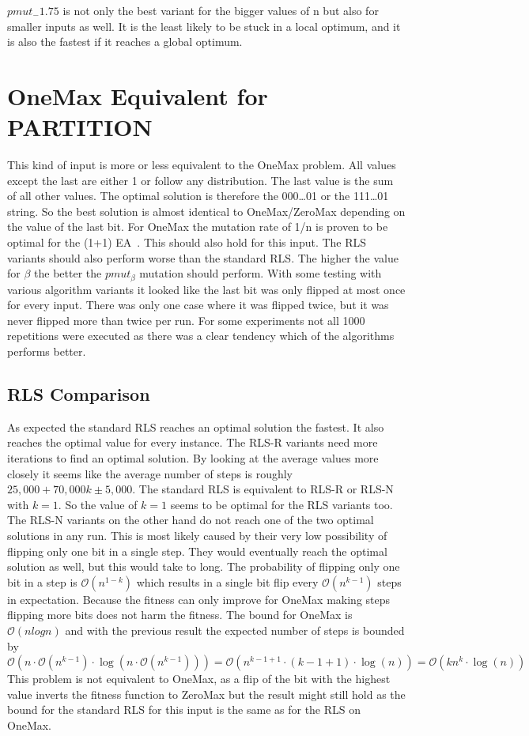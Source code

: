 $pmut_-1.75$ is not only the best variant for the bigger values of n but also for smaller inputs as well.
It is the least likely to be stuck in a local optimum, and it is also the fastest if it reaches a global optimum.
\section{OneMax Equivalent for PARTITION}
This kind of input is more or less equivalent to the OneMax problem. All values except the last are either 1 or follow any distribution. The last value is the sum of all other values. The optimal solution is therefore the 000\dots01 or
the 111\dots01 string. So the best solution is almost identical to OneMax/ZeroMax depending on the value of the last bit.\newline
For OneMax the mutation rate of 1/n is proven to be optimal for the (1+1) EA~\cite{witt2013tight}.
This should also hold for this input.
The RLS variants should also perform worse than the standard RLS.
The higher the value for $\beta$ the better the $pmut_\beta$ mutation should perform.
With some testing with various algorithm variants it looked like the last bit was only flipped at most once for every input.
There was only one case where it was flipped twice, but it was never flipped more than twice per run.\newline
For some experiments not all 1000 repetitions were executed as there was a clear tendency which of the algorithms performs better.
\subsection{RLS Comparison}




As expected the standard RLS reaches an optimal solution the fastest.
It also reaches the optimal value for every instance.
The RLS-R variants need more iterations to find an optimal solution.
By looking at the average values more closely it seems like the average number of steps is roughly $25,000 + 70,000k \pm 5,000$.
The standard RLS is equivalent to RLS-R or RLS-N with $k=1$.
So the value of $k=1$ seems to be optimal for the RLS variants too.
The RLS-N variants on the other hand do not reach one of the two optimal solutions in any run.
This is most likely caused by their very low possibility of flipping only one bit in a single step.
They would eventually reach the optimal solution as well, but this would take to long.
The probability of flipping only one bit in a step is $\mathcal{O}(n^{1-k})$ which results in a single bit flip every $\mathcal{O}(n^{k-1})$ steps in expectation.
Because the fitness can only improve for OneMax making steps flipping more bits does not harm the fitness.
The bound for OneMax is $\mathcal{O}(nlogn)$ and with the previous result the expected number of steps is bounded by
$\mathcal{O}(n\cdot\mathcal{O}(n^{k-1})\cdot \log(n\cdot\mathcal{O}(n^{k-1}))) 
=\mathcal{O}(n^{k-1+1}\cdot (k-1+1)\cdot\log(n))
=\mathcal{O}(kn^{k}\cdot\log(n))$
This problem is not equivalent to OneMax, as a flip of the bit with the highest value inverts the fitness function to ZeroMax but the result might still hold as the bound for the standard RLS for this input is the same as for the RLS on OneMax.
